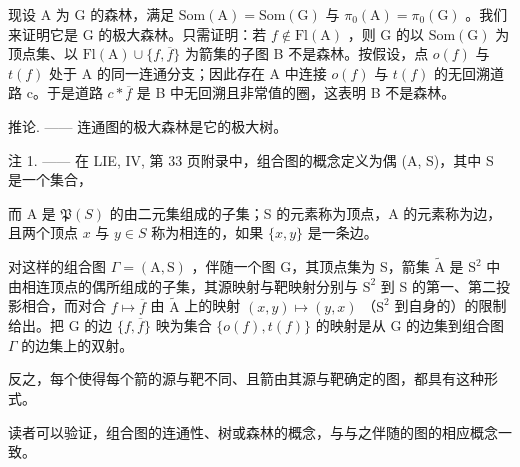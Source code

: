 现设 A 为 G 的森林，满足 \(\mathrm{Som}(\mathrm{A}) = \mathrm{Som}(\mathrm{G})\) 与 \(\pi_{0}(\mathrm{A}) = \pi_{0}(\mathrm{G})\) 。我们来证明它是 G 的极大森林。只需证明：若 \(f \notin \mathrm{Fl}(\mathrm{A})\) ，则 G 的以 \(\mathrm{Som}(\mathrm{G})\) 为顶点集、以 \(\mathrm{Fl}(\mathrm{A}) \cup \{f, \overline{f}\}\) 为箭集的子图 B 不是森林。按假设，点 \(o(f)\) 与 \(t(f)\) 处于 A 的同一连通分支；因此存在 A 中连接 \(o(f)\) 与 \(t(f)\) 的无回溯道路 c。于是道路 \(c * \overline{f}\) 是 B 中无回溯且非常值的圈，这表明 B 不是森林。

推论. —— 连通图的极大森林是它的极大树。

注 1. —— 在 LIE, IV, 第 33 页附录中，组合图的概念定义为偶 (A, S)，其中 S 是一个集合，

而 A 是 \(\mathfrak{P}(S)\) 的由二元集组成的子集；S 的元素称为顶点，A 的元素称为边，且两个顶点 \(x\) 与 \(y \in S\) 称为相连的，如果 \(\{x, y\}\) 是一条边。

对这样的组合图 \(\Gamma = (\mathrm{A},\mathrm{S})\) ，伴随一个图 G，其顶点集为 S，箭集 \(\widetilde{\mathrm{A}}\) 是 \(\mathrm{S}^2\) 中由相连顶点的偶所组成的子集，其源映射与靶映射分别与 \(\mathrm{S}^2\) 到 S 的第一、第二投影相合，而对合 \(f\mapsto \overline{f}\) 由 \(\widetilde{\mathrm{A}}\) 上的映射 \((x,y)\mapsto (y,x)\) （\(\mathrm{S}^2\) 到自身的）的限制给出。把 G 的边 \(\{f,\overline{f}\}\) 映为集合 \(\{o(f),t(f)\}\) 的映射是从 G 的边集到组合图 \(\Gamma\) 的边集上的双射。

反之，每个使得每个箭的源与靶不同、且箭由其源与靶确定的图，都具有这种形式。

读者可以验证，组合图的连通性、树或森林的概念，与与之伴随的图的相应概念一致。

